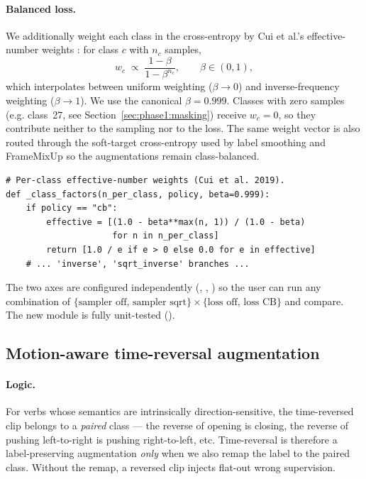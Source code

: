 \paragraph{Balanced loss.} We additionally weight each class in the
cross-entropy by Cui et al.'s effective-number weights
\cite{Cui2019CB}: for class \(c\) with \(n_c\) samples,
\[
w_c \;\propto\; \frac{1-\beta}{1-\beta^{n_c}}, \qquad \beta \in (0, 1),
\]
which interpolates between uniform weighting (\(\beta \to 0\)) and
inverse-frequency weighting (\(\beta \to 1\)). We use the canonical
\(\beta = 0.999\). Classes with zero samples (e.g. class~27, see
Section~\ref{sec:phase1:masking}) receive \(w_c = 0\), so they
contribute neither to the sampling nor to the loss. The same weight
vector is also routed through the soft-target cross-entropy used by
label smoothing and FrameMixUp so the augmentations remain class-balanced.

\begin{lstlisting}[style=py]
# Per-class effective-number weights (Cui et al. 2019).
def _class_factors(n_per_class, policy, beta=0.999):
    if policy == "cb":
        effective = [(1.0 - beta**max(n, 1)) / (1.0 - beta)
                     for n in n_per_class]
        return [1.0 / e if e > 0 else 0.0 for e in effective]
    # ... 'inverse', 'sqrt_inverse' branches ...
\end{lstlisting}

The two axes are configured independently
(,
,
) so the user can run any
combination of \(\{\text{sampler off, sampler sqrt}\} \times
\{\text{loss off, loss CB}\}\) and compare. The new
 module is fully unit-tested
().

\subsection{Motion-aware time-reversal augmentation}
\label{sec:tracka-phase4:timereversal}

\paragraph{Logic.} For verbs whose semantics are intrinsically
direction-sensitive, the time-reversed clip belongs to a \emph{paired}
class --- the reverse of opening is closing, the reverse of pushing
left-to-right is pushing right-to-left, etc. Time-reversal is therefore
a label-preserving augmentation \emph{only} when we also remap the
label to the paired class. Without the remap, a reversed clip injects
flat-out wrong supervision.

